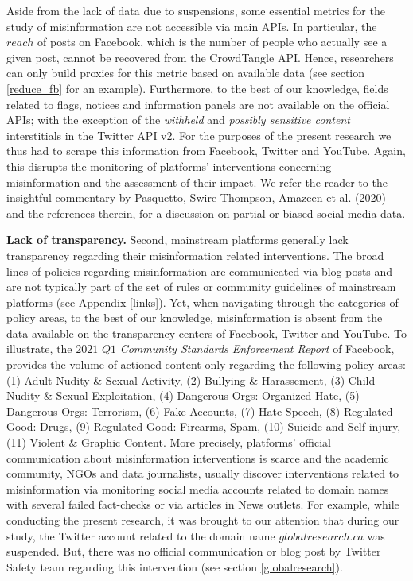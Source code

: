 \documentclass{article}
\begin{document}
\smallskip 

Aside from the lack of data due to suspensions, some essential metrics for the study of misinformation are not accessible via main APIs. In particular, the $reach$ of posts on Facebook, which is the number of people who actually see a given post, cannot be recovered from the CrowdTangle API. Hence, researchers can only build proxies for this metric based on available data (see section \ref{reduce_fb} for an example). Furthermore, to the best of our knowledge, fields related to flags, notices and information panels are not available on the official APIs; with the exception of the {\it withheld}  and {\it possibly sensitive content} interstitials in the Twitter API v2. For the purposes of the present research we thus had to scrape this information from Facebook, Twitter and YouTube. Again, this disrupts the monitoring of platforms' interventions concerning misinformation and the assessment of their impact. We refer the reader to the insightful commentary by Pasquetto, Swire-Thompson, Amazeen et al. (2020)~\cite{pasquetto} and the references therein, for a discussion on partial or biased social media data.

\smallskip

{\bf Lack of transparency.} Second, mainstream platforms generally lack transparency regarding their misinformation related interventions.  The broad lines of policies regarding misinformation are communicated via blog posts and are not typically part of the set of rules or community guidelines of mainstream platforms (see Appendix \ref{links}). Yet, when navigating through the categories of policy areas, to the best of our knowledge, misinformation is absent from the data available on the transparency centers of Facebook, Twitter and YouTube. To illustrate, the $2021$ $Q1$ {\it Community Standards Enforcement Report} of Facebook, provides the volume of actioned content only regarding the following policy areas: (1) Adult Nudity \& Sexual Activity, (2) Bullying \& Harassement, (3) Child Nudity \& Sexual Exploitation, (4) Dangerous Orgs: Organized Hate, (5) Dangerous Orgs: Terrorism, (6) Fake Accounts, (7) Hate Speech, (8) Regulated Good: Drugs, (9) Regulated Good: Firearms, Spam, (10) Suicide and Self-injury, (11) Violent \& Graphic Content. More precisely, platforms' official communication about misinformation interventions is scarce and the academic community, NGOs and data journalists, usually discover interventions related to misinformation via monitoring social media accounts related to domain names with several failed fact-checks or via articles in News outlets. For example, while conducting the present research, it was brought to our attention that during our study, the Twitter account related to the domain name $globalresearch.ca$ was suspended. But, there was no official communication or blog post by Twitter Safety team regarding this intervention (see section \ref{globalresearch}). 
\end{document}
